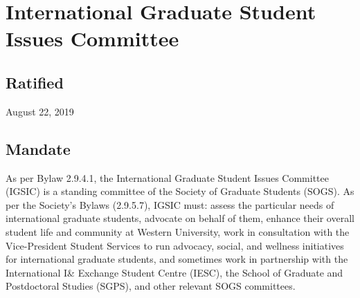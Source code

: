 \section{International Graduate Student Issues Committee}
\subsection{Ratified}
August 22, 2019
\subsection{Mandate}
As per Bylaw 2.9.4.1, the International Graduate Student Issues Committee (IGSIC) is a standing committee of the Society of Graduate Students (SOGS). As per the Society’s Bylaws (2.9.5.7), IGSIC must: assess the particular needs of international graduate students, advocate on behalf of them, enhance their overall student life and community at Western University, work in consultation with the Vice-President Student Services to run advocacy, social, and wellness initiatives for international graduate students, and sometimes work in partnership with the International I\& Exchange Student Centre (IESC), the School of Graduate and Postdoctoral Studies (SGPS), and other relevant SOGS committees.
